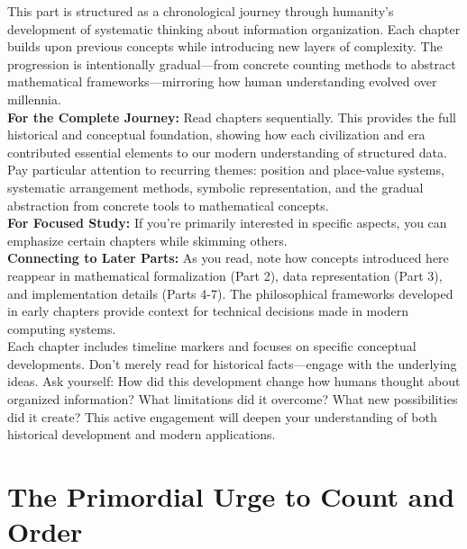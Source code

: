 \documentclass[12pt, oneside, openany]{book}
\begin{document}
This part is structured as a chronological journey through humanity's development of systematic thinking about information organization. Each chapter builds upon previous concepts while introducing new layers of complexity. The progression is intentionally gradual—from concrete counting methods to abstract mathematical frameworks—mirroring how human understanding evolved over millennia.\\
\textbf{For the Complete Journey:} Read chapters sequentially. This provides the full historical and conceptual foundation, showing how each civilization and era contributed essential elements to our modern understanding of structured data. Pay particular attention to recurring themes: position and place-value systems, systematic arrangement methods, symbolic representation, and the gradual abstraction from concrete tools to mathematical concepts.\\
\textbf{For Focused Study:} If you're primarily interested in specific aspects, you can emphasize certain chapters while skimming others.\\
\textbf{Connecting to Later Parts:} As you read, note how concepts introduced here reappear in mathematical formalization (Part 2), data representation (Part 3), and implementation details (Parts 4-7). The philosophical frameworks developed in early chapters provide context for technical decisions made in modern computing systems.\\
Each chapter includes timeline markers and focuses on specific conceptual developments. Don't merely read for historical facts—engage with the underlying ideas. Ask yourself: How did this development change how humans thought about organized information? What limitations did it overcome? What new possibilities did it create? This active engagement will deepen your understanding of both historical development and modern applications.


\chapter{The Primordial Urge to Count and Order}
\end{document}
